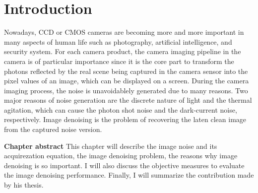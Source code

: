 %

\chapter{Introduction}
\label{sec:intro}



Nowadays, CCD or CMOS cameras are becoming more and more important in many aspects of human life such as photography, artificial intelligence, and security system. For each camera product, the camera imaging pipeline in the camera is of particular importance since it is the core part to transform the photons reflected by the real scene being captured in the camera sensor into the pixel values of an image, which can be displayed on a screen. During the camera imaging process, the noise is unavoidablely generated due to many reasons. Two major reasons of noise generation are the discrete nature of light and the thermal agitation, which can cause the photon shot noise and the dark-current noise, respectively. Image denoising is the problem of recovering the laten clean image from the captured noise version. 

\textbf{Chapter abstract} This chapter will describe the image noise and its acquirezation equation, the image denoising problem, the reasons why image denoising is so important. I will also discuss the objective measures to evaluate the image denoising performance. Finally, I will summarize the contribution made by his thesis.



